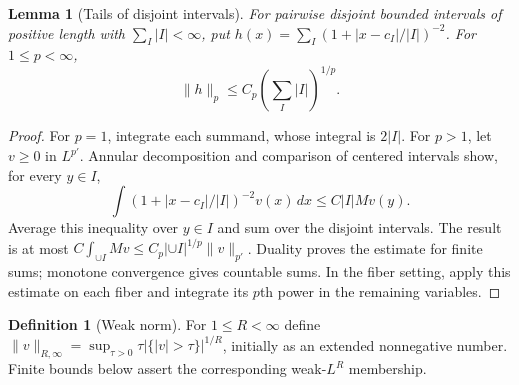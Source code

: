 \documentclass[12pt,reqno]{amsart}
\theoremstyle{plain}
\newtheorem{lemma}[theorem]{Lemma}
\theoremstyle{definition}
\newtheorem{definition}[theorem]{Definition}
\theoremstyle{remark}
\numberwithin{equation}{section}
\newcommand{\dd}{\,d}
\begin{document}
\begin{lemma}[Tails of disjoint intervals]\label{lem:interval_tails}
For pairwise disjoint bounded intervals of positive length with
$\sum_I|I|<\infty$,
put $h(x)=\sum_I(1+|x-c_I|/|I|)^{-2}$. For $1\le p<\infty$,
\[
 \|h\|_p\le C_p\left(\sum_I|I|\right)^{1/p}.
\]
\end{lemma}
\begin{proof}
For $p=1$, integrate each summand, whose integral is $2|I|$.
For $p>1$, let $v\ge0$ in $L^{p'}$. Annular decomposition and
comparison of centered intervals show, for every $y\in I$,
\[
 \int(1+|x-c_I|/|I|)^{-2}v(x)\dd x\le C|I|Mv(y).
\]
Average this inequality over $y\in I$ and sum over the disjoint
intervals. The result is at most
$C\int_{\cup I}Mv\le C_p|\cup I|^{1/p}\|v\|_{p'}$.
Duality proves the estimate for finite sums; monotone convergence
gives countable sums. In the fiber setting, apply this estimate on
each fiber and integrate its $p$th power in the remaining variables.
\end{proof}

\begin{definition}[Weak norm]\label{def:weak_norm}
For $1\le R<\infty$ define
$\|v\|_{R,\infty}=\sup_{\tau>0}\tau|\{|v|>\tau\}|^{1/R}$,
initially as an extended nonnegative number. Finite bounds below
assert the corresponding weak-$L^R$ membership.
\end{definition}
\end{document}

